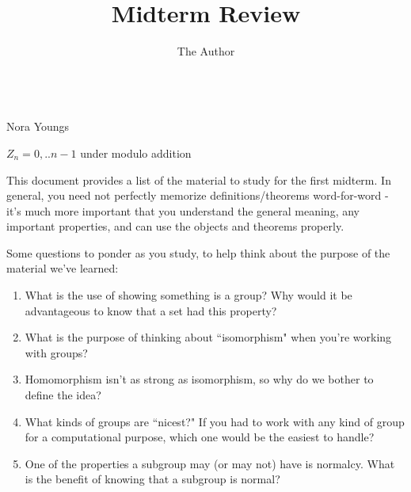 \documentclass[11pt, oneside]{article}
\title{Midterm Review}
\author{The Author}
\begin{document}
\begin{center}\\Nora Youngs\\ \end{center}
\thispagestyle{empty}
$Z_n={0,..n-1}$ under modulo addition


This document provides a list of the material to study for the first midterm. In general, you need not perfectly memorize definitions/theorems word-for-word - it's much more important that you understand the general meaning, any important properties, and can use the objects and theorems properly. 

Some questions to ponder as you study, to help think about the purpose of the material we've learned:

\begin{enumerate}
\item What is the use of showing something is a group? Why would it be advantageous to know that a set had this property?
\item What is the purpose of thinking about ``isomorphism" when you're working with groups?
\item Homomorphism isn't as strong as isomorphism, so why do we bother to define the idea?
\item What kinds of groups are ``nicest?"  If you had to work with any kind of group for a computational purpose, which one would be the easiest to handle? 
\item One of the properties a subgroup may (or may not) have is normalcy. What is the benefit of knowing that a subgroup is normal?
\end{enumerate}
\hrulefill %
\end{document}
